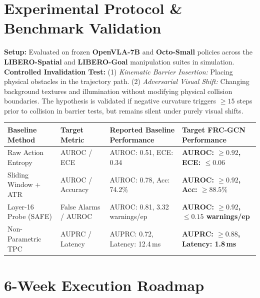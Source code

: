 \documentclass[10pt,a4paper]{article}
\begin{document}
\section{Experimental Protocol \& Benchmark Validation}

\textbf{Setup:} Evaluated on frozen \textbf{OpenVLA-7B} and \textbf{Octo-Small} policies across the \textbf{LIBERO-Spatial} and \textbf{LIBERO-Goal} manipulation suites in simulation.\\
\textbf{Controlled Invalidation Test:} (1) \textit{Kinematic Barrier Insertion:} Placing physical obstacles in the trajectory path. (2) \textit{Adversarial Visual Shift:} Changing background textures and illumination without modifying physical collision boundaries. The hypothesis is validated if negative curvature triggers $\ge 15$ steps prior to collision in barrier tests, but remains silent under purely visual shifts.

\vspace{0.3em}
\begin{center}
\small
\begin{tabularx}{\textwidth}{l l X X}
\toprule
\textbf{Baseline Method} & \textbf{Target Metric} & \textbf{Reported Baseline Performance} & \textbf{Target FRC-GCN Performance} \\
\midrule
Raw Action Entropy & AUROC / ECE & AUROC: 0.51, ECE: 0.34 & \textbf{AUROC: $\ge 0.92$, ECE: $\le 0.06$} \\
Sliding Window + ATR & AUROC / Accuracy & AUROC: 0.78, Acc: 74.2\% & \textbf{AUROC: $\ge 0.92$, Acc: $\ge 88.5\%$} \\
Layer-16 Probe (SAFE) & False Alarms / AUROC & AUROC: 0.81, 3.32 warnings/ep & \textbf{AUROC: $\ge 0.92$, $\le 0.15$ warnings/ep} \\
Non-Parametric TPC & AUPRC / Latency & AUPRC: 0.72, Latency: 12.4\,ms & \textbf{AUPRC: $\ge 0.88$, Latency: 1.8\,ms} \\
\bottomrule
\end{tabularx}
\end{center}

\section{6-Week Execution Roadmap}
\end{document}
